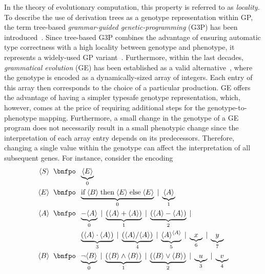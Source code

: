 In the theory of evolutionary computation, this property is referred to as \emph{locality}.
To describe the use of derivation trees as a genotype representation within GP, the term tree-based \emph{grammar-guided genetic-programming} (G3P) has been introduced~\cite{mckay2010grammar,whigham1995grammatically}.
Since tree-based G3P combines the advantage of ensuring automatic type correctness with a high locality between genotype and phenotype, it represents a widely-used GP variant~\cite{mckay2010grammar}.
Furthermore, within the last decades, \emph{grammatical evolution} (GE) has been established as a valid alternative~\cite{oneill2001grammatical,zz_ge1,zz_ge2}, where the genotype is encoded as a dynamically-sized array of integers. 
Each entry of this array then corresponds to the choice of a particular production.
GE offers the advantage of having a simpler typesafe genotype representation, which, however, comes at the price of requiring additional steps for the genotype-to-phenotype mapping.
Furthermore, a small change in the genotype of a GE program does not necessarily result in a small phenotypic change since the interpretation of each array entry depends on its predecessors.
Therefore, changing a single value within the genotype can affect the interpretation of all subsequent genes.
For instance, consider the encoding
\begin{equation}
	\begin{split}
		\ps S \; \; \bnfpo & \; \; \underbrace{\ps E}_{0} \\
		\ps E \; \; \bnfpo & \; \; \underbrace{\text{if} \; \ps B \; \text{then} \; \ps E \; \text{else} \; \ps E}_{0} \; | \; \underbrace{\ps A}_{1} \\
		\ps A \; \; \bnfpo & \; \; \underbrace{-\ps A}_0 \; | \; \underbrace{(\ps A + \ps A)}_{1} \; | \; \underbrace{(\ps A - \ps A)}_2 \; |   \\  
		&  \; \; \underbrace{(\ps A \cdot \ps A)}_{3} \; | \; \underbrace{(\ps A / \ps A)}_{4} \; | \; \underbrace{\ps{A}^{\ps A}}_{5} \; | \; \underbrace{x}_{6} \; | \; \underbrace{y}_{7} \\
		\ps B \; \; \bnfpo & \; \; \underbrace{\neg \ps B}_{0} \; | \; \underbrace{(\ps B \wedge \ps B)}_{1} \; | \; \underbrace{(\ps B \vee \ps B)}_{2} \; | \; \underbrace{u}_3 \; | \; \underbrace{v}_4
	\end{split}
	\label{eq:gp-example-grammar-ge-encoding}
\end{equation}
